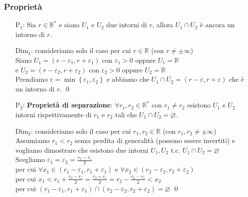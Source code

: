 \documentclass[a4paper]{article}
\begin{document}
\subsubsection*{Proprietà}
\begin{itemize}
	\item[P\(_1\):] Sia \(r \in \mathbb{R}^*\) e siano \(U_1\) e \(U_2\) due intorni di \(r\), allora \(U_1 \cap U_2\) è ancora un intorno di \(r\).
	\item[Dim\(_1\):] consideriamo solo il caso per cui \(r \in \mathbb{R}\) (con \(r \neq \pm \infty\)) \\
	Siano \(U_1 = \left( r - \varepsilon_1, r + \varepsilon_1 \right)\) con \(\varepsilon_1 > 0\) oppure \(U_1 = \mathbb{R}\) \\
	e \(U_2 = \left( r - \varepsilon_2, r + \varepsilon_2 \right)\) con \(\varepsilon_2 > 0\) oppure \(U_2 = \mathbb{R}\) \\
	Prendiamo \(\varepsilon = \min \left\{ \varepsilon_1 , \varepsilon_2 \right\}\) e abbiamo che \(U_1 \cap U_2 = \left( r - \varepsilon, r + \varepsilon \right)\) che è un intorno di \(r\). \qed
	
	\item[P\(_2\):] \textbf{Proprietà di separazione}: \(\forall r_1, r_2 \in \mathbb{R}^*\) con \(r_1 \neq r_2\) esistono \(U_1\) e \(U_2\) intorni
	rispettivamente di \(r_1\) e \(r_2\) tali che \(U_1 \cap U_2 = \varnothing\).
	\item[Dim\(_2\):] consideriamo solo il caso per cui \(r_1, r_2 \in \mathbb{R}\) (con \(r_1, r_2 \neq \pm \infty\)) \\
	Assumiamo \(r_1 < r_2\) senza perdita di generalità (possono essere invertiti) e vogliamo dimostrare che esistono due intorni \(U_1, U_2\) t.c. \(U_1 \cap U_2 = \varnothing\) \\
	Scegliamo \(\varepsilon_1 = \varepsilon_2 = \displaystyle \frac{r_2 - r_1}{2}\) \\
	per cui \(\forall x_1 \in (r_1 - \varepsilon_1 , r_1 + \varepsilon_1)\) e \(\forall x_2 \in (r_2 - \varepsilon_2 , r_2 + \varepsilon_2)\) \\
	per cui \(x_1 < r_1 + \displaystyle \frac{r_2 - r_1}{2} = \frac{r_2 + r_1}{2} = r_2 - \frac{r_2 - r_1}{2} < x_2\) \\
	per cui \(\left( r_1 - \varepsilon_1, r_1 + \varepsilon_1 \right) \cap \left( r_2 - \varepsilon_2, r_2 + \varepsilon_2 \right) = \varnothing\) \qed
\end{itemize}
\end{document}
